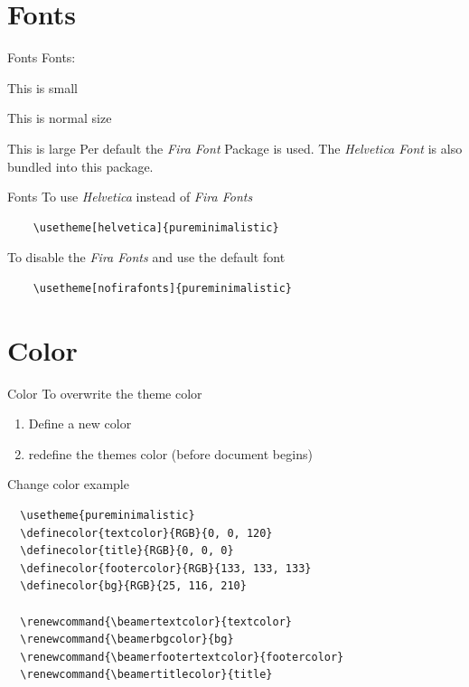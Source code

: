 \documentclass{article}
\begin{document}
\section{Fonts}
\begin{frame}[fragile]{Fonts}
  Fonts:

  {\small This is small}

  This is normal size

    {\large This is large}
  \vfill
  Per default the \emph{Fira Font} Package is
  used. The \emph{Helvetica Font} is also bundled into this
  package.
\end{frame}

\begin{frame}[fragile]{Fonts}
  To use \emph{Helvetica} instead of \emph{Fira Fonts}
  \begin{verbatim}
    \usetheme[helvetica]{pureminimalistic}
  \end{verbatim}
  \vfill
  To disable the \emph{Fira Fonts} and use the default font
  \begin{verbatim}
    \usetheme[nofirafonts]{pureminimalistic}
  \end{verbatim}
\end{frame}

\section{Color}
\begin{frame}[fragile]{Color}
  To overwrite the theme color
  \begin{enumerate}
    \item Define a new color
    \item redefine the themes color (before document begins)
  \end{enumerate}
\end{frame}

\begin{frame}[fragile]{Change color example}
  \small
  \begin{verbatim}
  \usetheme{pureminimalistic}
  \definecolor{textcolor}{RGB}{0, 0, 120}
  \definecolor{title}{RGB}{0, 0, 0}
  \definecolor{footercolor}{RGB}{133, 133, 133}
  \definecolor{bg}{RGB}{25, 116, 210}

  \renewcommand{\beamertextcolor}{textcolor}
  \renewcommand{\beamerbgcolor}{bg}
  \renewcommand{\beamerfootertextcolor}{footercolor}
  \renewcommand{\beamertitlecolor}{title}
  \end{verbatim}
\end{frame}
\end{document}
